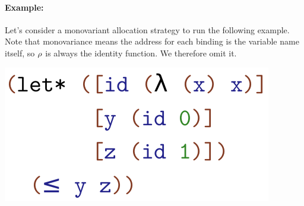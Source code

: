 \paragraph{Example:} Let's consider a monovariant allocation strategy to run the following example.
Note that monovariance means the address for each binding is the variable name itself, so $\rho$ is always the identity function. We therefore omit it.

\begin{center}
  \includegraphics[scale=0.5]{example0}
\end{center}


